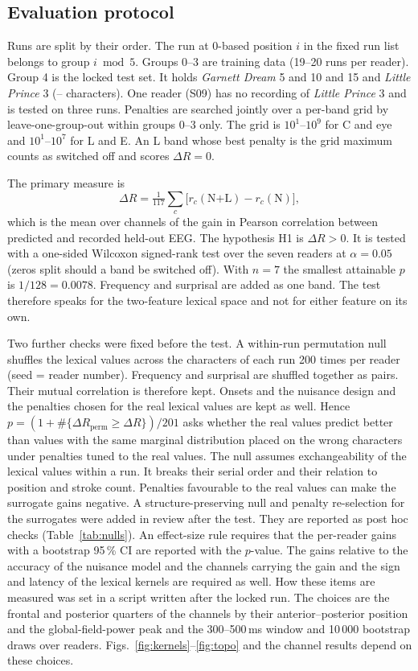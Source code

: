 \documentclass[sigconf]{acmart}
\newcommand{\dR}{\Delta R}
\begin{document}
\subsection{Evaluation protocol}
Runs are split by their order. The run at 0-based position $i$ in the fixed run list belongs to group $i \bmod 5$. Groups 0--3 are training data (19--20 runs per reader). Group 4 is the locked test set. It holds \emph{Garnett Dream} 5 and 10 and 15 and \emph{Little Prince} 3 (\testCharsMin--\testCharsMax{} characters). One reader (S09) has no recording of \emph{Little Prince} 3 and is tested on three runs. Penalties are searched jointly over a per-band grid by leave-one-group-out within groups 0--3 only. The grid is $10^1$--$10^9$ for C and eye and $10^1$--$10^7$ for L and E. An L band whose best penalty is the grid maximum counts as switched off and scores $\dR = 0$.

The primary measure is
\[
\dR = \tfrac{1}{117}\textstyle\sum_{c} \bigl[r_c(\text{N+L}) - r_c(\text{N})\bigr],
\]
which is the mean over channels of the gain in Pearson correlation between predicted and recorded held-out EEG. The hypothesis H1 is $\dR > 0$. It is tested with a one-sided Wilcoxon signed-rank test over the seven readers at $\alpha = 0.05$ (zeros split should a band be switched off). With $n = 7$ the smallest attainable $p$ is $1/128 = 0.0078$. Frequency and surprisal are added as one band. The test therefore speaks for the two-feature lexical space and not for either feature on its own.

Two further checks were fixed before the test. A within-run permutation null shuffles the lexical values across the characters of each run 200 times per reader (seed = reader number). Frequency and surprisal are shuffled together as pairs. Their mutual correlation is therefore kept. Onsets and the nuisance design and the penalties chosen for the real lexical values are kept as well. Hence $p = (1 + \#\{\dR_\text{perm} \ge \dR\})/201$ asks whether the real values predict better than values with the same marginal distribution placed on the wrong characters under penalties tuned to the real values. The null assumes exchangeability of the lexical values within a run. It breaks their serial order and their relation to position and stroke count. Penalties favourable to the real values can make the surrogate gains negative. A structure-preserving null and penalty re-selection for the surrogates were added in review after the test. They are reported as post hoc checks (Table~\ref{tab:nulls}). An effect-size rule requires that the per-reader gains with a bootstrap 95\,\% CI are reported with the $p$-value. The gains relative to the accuracy of the nuisance model and the channels carrying the gain and the sign and latency of the lexical kernels are required as well. How these items are measured was set in a script written after the locked run. The choices are the frontal and posterior quarters of the channels by their anterior--posterior position and the global-field-power peak and the 300--500\,ms window and 10\,000 bootstrap draws over readers. Figs.~\ref{fig:kernels}--\ref{fig:topo} and the channel results depend on these choices.
\end{document}
